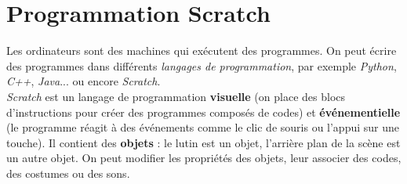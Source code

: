 \chapter{Programmation Scratch}\label{ficheScratch1}  

Les ordinateurs sont des machines qui exécutent des programmes. On peut écrire des programmes dans différents \emph{langages de programmation}, par exemple \emph{Python}, \emph{C++}, \emph{Java}... ou encore \emph{Scratch}.\\

\emph{Scratch} est un langage de programmation \textbf{visuelle} (on place des blocs d'instructions pour créer des programmes composés de codes) et \textbf{événementielle} (le programme réagit à des événements comme le clic de souris ou l'appui sur une touche). Il contient des \textbf{objets} : le lutin est un objet, l'arrière plan de la scène est un autre objet. On peut modifier les propriétés des objets, leur associer des codes, des costumes ou des sons.   \\

